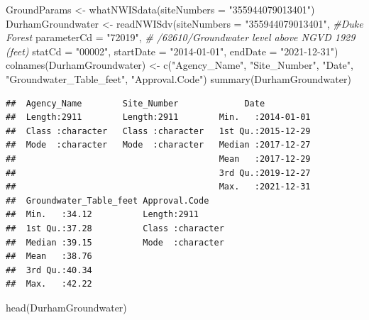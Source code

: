 \documentclass[
  12pt,
]{article}
\newenvironment{Shaded}{\begin{snugshade}}{\end{snugshade}}
\newcommand{\AttributeTok}[1]{\textcolor[rgb]{0.77,0.63,0.00}{#1}}
\newcommand{\CommentTok}[1]{\textcolor[rgb]{0.56,0.35,0.01}{\textit{#1}}}
\newcommand{\FunctionTok}[1]{\textcolor[rgb]{0.00,0.00,0.00}{#1}}
\newcommand{\NormalTok}[1]{#1}
\newcommand{\OtherTok}[1]{\textcolor[rgb]{0.56,0.35,0.01}{#1}}
\newcommand{\StringTok}[1]{\textcolor[rgb]{0.31,0.60,0.02}{#1}}
\begin{document}
\begin{Shaded}
\begin{Highlighting}[]
\NormalTok{GroundParams }\OtherTok{\textless{}{-}} \FunctionTok{whatNWISdata}\NormalTok{(}\AttributeTok{siteNumbers =} \StringTok{"355944079013401"}\NormalTok{)}
\NormalTok{DurhamGroundwater }\OtherTok{\textless{}{-}} \FunctionTok{readNWISdv}\NormalTok{(}\AttributeTok{siteNumbers =} \StringTok{"355944079013401"}\NormalTok{, }\CommentTok{\#Duke Forest}
                                 \AttributeTok{parameterCd =} \StringTok{"72019"}\NormalTok{, }\CommentTok{\# /62610/Groundwater level above NGVD 1929 (feet)}
                                 \AttributeTok{statCd =} \StringTok{"00002"}\NormalTok{,}
                                 \AttributeTok{startDate =} \StringTok{"2014{-}01{-}01"}\NormalTok{,}
                                 \AttributeTok{endDate =} \StringTok{"2021{-}12{-}31"}\NormalTok{)}
\FunctionTok{colnames}\NormalTok{(DurhamGroundwater) }\OtherTok{\textless{}{-}} \FunctionTok{c}\NormalTok{(}\StringTok{"Agency\_Name"}\NormalTok{,}
                                 \StringTok{"Site\_Number"}\NormalTok{,}
                                 \StringTok{"Date"}\NormalTok{,}
                                 \StringTok{"Groundwater\_Table\_feet"}\NormalTok{, }
                                 \StringTok{"Approval.Code"}\NormalTok{)}
\FunctionTok{summary}\NormalTok{(DurhamGroundwater)}
\end{Highlighting}
\end{Shaded}

\begin{verbatim}
##  Agency_Name        Site_Number             Date           
##  Length:2911        Length:2911        Min.   :2014-01-01  
##  Class :character   Class :character   1st Qu.:2015-12-29  
##  Mode  :character   Mode  :character   Median :2017-12-27  
##                                        Mean   :2017-12-29  
##                                        3rd Qu.:2019-12-27  
##                                        Max.   :2021-12-31  
##  Groundwater_Table_feet Approval.Code     
##  Min.   :34.12          Length:2911       
##  1st Qu.:37.28          Class :character  
##  Median :39.15          Mode  :character  
##  Mean   :38.76                            
##  3rd Qu.:40.34                            
##  Max.   :42.22
\end{verbatim}

\begin{Shaded}
\begin{Highlighting}[]
\FunctionTok{head}\NormalTok{(DurhamGroundwater)}
\end{Highlighting}
\end{Shaded}
\end{document}
